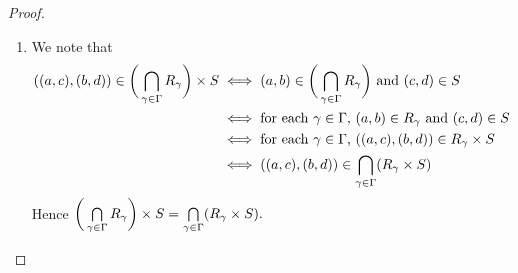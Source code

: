 \begin{proof}
\begin{enumerate}
\begin{enumerate}
\begin{align*}
				& \iff \text{$(a,b) \in \bigg( \bigcup\limits_{\gam \in \Gam} R_{\gam}\bigg)$ and $(c,d) \in S$} \\
				& \iff \text{there exists $\gam_0 \in \Gam$ such that $(a,b) \in R_{\gam_0}$ and $(c,d) \in S$} \\
				& \iff \text{there exists $\gam_0 \in \Gam$ such that $((a,c), (b,d)) \in R_{\gam_0} \times S$} \\
				& \iff ((a,c), (b,d)) \in \bigcup\limits_{\gam \in \Gam}( R_{\gam} \times S)
			\end{align*}
			Hence $\bigg( \bigcup\limits_{\gam \in \Gam} R_{\gam}\bigg) \times S = \bigcup\limits_{\gam \in \Gam}( R_{\gam} \times S).$
			\item We note that
			\begin{align*}
				((a,c), (b,d)) \in \bigg( \bigcap\limits_{\gamma \in \Gamma} R_{\gamma}\bigg) \times S
				& \iff \text{$(a,b) \in \bigg( \bigcap\limits_{\gamma \in \Gamma} R_{\gamma}\bigg)$ and $(c,d) \in S$} \\
				& \iff \text{for each $\gamma \in \Gamma$, $(a,b) \in R_{\gamma}$ and $(c,d) \in S$} \\
				& \iff \text{for each $\gamma \in \Gamma$, $((a,c), (b,d)) \in R_{\gamma} \times S$} \\
				& \iff ((a,c), (b,d)) \in \bigcap\limits_{\gamma \in \Gamma}(R_{\gamma} \times S)
			\end{align*}
			Hence $\bigg( \bigcap\limits_{\gamma \in \Gamma} R_{\gamma}\bigg) \times S = \bigcap\limits_{\gamma \in \Gamma}( R_{\gamma} \times S).$
		\end{enumerate}
	\end{enumerate}
\end{proof}








































